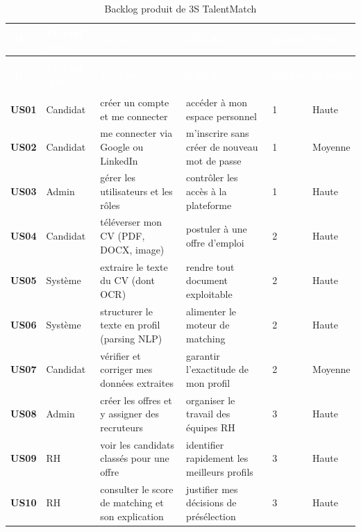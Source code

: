 \documentclass[12pt,a4paper]{report}
\begin{document}
{\small
\setlength{\tabcolsep}{4pt}
\begin{longtable}{>{\bfseries}p{0.9cm} p{1.9cm} p{4.6cm} p{4.0cm} p{1.1cm} p{1.4cm}}
\caption{Backlog produit de 3S TalentMatch}
\label{tab:backlog} \\
\rowcolor{tabheader}
\textcolor{white}{\textbf{ID}} & \textcolor{white}{\textbf{En tant que\ldots}} & \textcolor{white}{\textbf{Je veux\ldots}} & \textcolor{white}{\textbf{Afin de\ldots}} & \textcolor{white}{\textbf{Sprint}} & \textcolor{white}{\textbf{Priorité}} \\
\endfirsthead
\multicolumn{6}{c}{\textit{(Suite du tableau~\ref{tab:backlog})}} \\
\rowcolor{tabheader}
\textcolor{white}{\textbf{ID}} & \textcolor{white}{\textbf{En tant que\ldots}} & \textcolor{white}{\textbf{Je veux\ldots}} & \textcolor{white}{\textbf{Afin de\ldots}} & \textcolor{white}{\textbf{Sprint}} & \textcolor{white}{\textbf{Priorité}} \\
\endhead
\midrule
\multicolumn{6}{r}{\textit{Suite page suivante}} \\
\endfoot
\bottomrule
\endlastfoot
US01 & Candidat & créer un compte et me connecter & accéder à mon espace personnel & 1 & Haute \\
\rowcolor{tabalt}
US02 & Candidat & me connecter via Google ou LinkedIn & m'inscrire sans créer de nouveau mot de passe & 1 & Moyenne \\
US03 & Admin & gérer les utilisateurs et les rôles & contrôler les accès à la plateforme & 1 & Haute \\
\rowcolor{tabalt}
US04 & Candidat & téléverser mon CV (PDF, DOCX, image) & postuler à une offre d'emploi & 2 & Haute \\
US05 & Système & extraire le texte du CV (dont OCR) & rendre tout document exploitable & 2 & Haute \\
\rowcolor{tabalt}
US06 & Système & structurer le texte en profil (parsing NLP) & alimenter le moteur de matching & 2 & Haute \\
US07 & Candidat & vérifier et corriger mes données extraites & garantir l'exactitude de mon profil & 2 & Moyenne \\
\rowcolor{tabalt}
US08 & Admin & créer les offres et y assigner des recruteurs & organiser le travail des équipes RH & 3 & Haute \\
US09 & RH & voir les candidats classés pour une offre & identifier rapidement les meilleurs profils & 3 & Haute \\
\rowcolor{tabalt}
US10 & RH & consulter le score de matching et son explication & justifier mes décisions de présélection & 3 & Haute \\

\end{longtable}}
\end{document}
